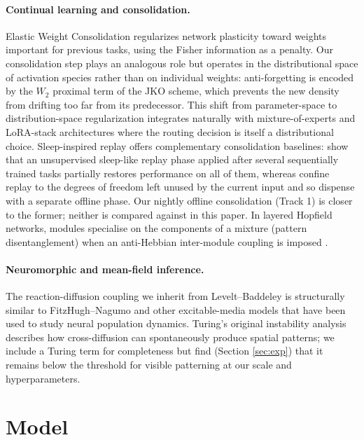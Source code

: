 \documentclass[11pt]{article}
\begin{document}
\paragraph{Continual learning and consolidation.}
Elastic Weight Consolidation \cite{kirkpatrick2017ewc} regularizes
network plasticity toward weights important for previous tasks, using
the Fisher information as a penalty. Our consolidation step plays an
analogous role but operates in the distributional space of activation
species rather than on individual weights: anti-forgetting is encoded by
the $W_2$ proximal term of the JKO scheme, which prevents the new
density from drifting too far from its predecessor. This shift from
parameter-space to distribution-space regularization integrates naturally
with mixture-of-experts and LoRA-stack architectures where the routing
decision is itself a distributional choice. Sleep-inspired replay offers
complementary consolidation baselines: \cite{bazhenov2026sleep} show that
an unsupervised sleep-like replay phase applied after several
sequentially trained tasks partially restores performance on all of
them, whereas \cite{zhang2026silent} confine replay to the degrees of
freedom left unused by the current input and so dispense with a
separate offline phase. Our nightly offline consolidation (Track 1) is
closer to the former; neither is compared against in this paper.
In layered Hopfield networks, modules specialise on the components
of a mixture (pattern disentanglement) when an anti-Hebbian
inter-module coupling is imposed
\cite{agliari2026networks,agliari2026modularrbm}.

\paragraph{Neuromorphic and mean-field inference.}
The reaction-diffusion coupling we inherit from Levelt--Baddeley is
structurally similar to FitzHugh--Nagumo and other excitable-media
models that have been used to study neural population dynamics. Turing's
original instability analysis describes how cross-diffusion can
spontaneously produce spatial patterns; we include a Turing term for
completeness but find (Section \ref{sec:exp}) that it remains below the
threshold for visible patterning at our scale and hyperparameters.

\section{Model}
\label{sec:model}
\end{document}
